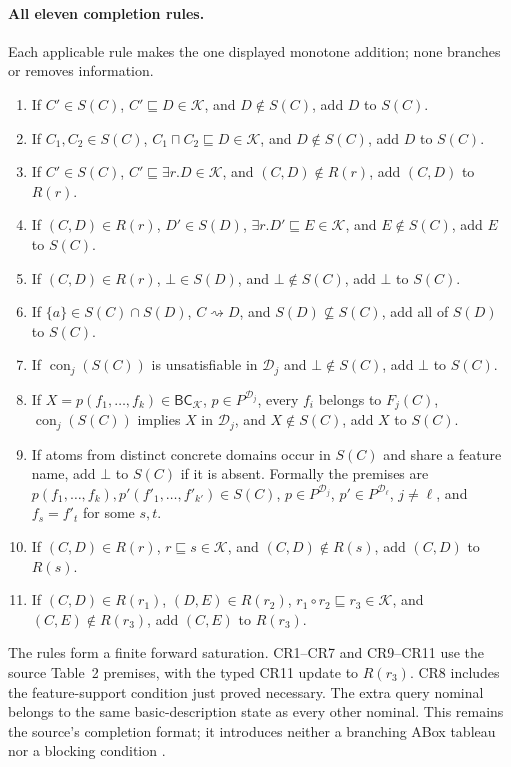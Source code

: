 \paragraph{All eleven completion rules.}
Each applicable rule makes the one displayed monotone addition; none branches
or removes information.
\begin{enumerate}
\item[(CR1)] If \(C'\in S(C)\), \(C'\sqsubseteq D\in\mathcal K\), and
\(D\notin S(C)\), add \(D\) to \(S(C)\).
\item[(CR2)] If \(C_1,C_2\in S(C)\),
\(C_1\sqcap C_2\sqsubseteq D\in\mathcal K\), and \(D\notin S(C)\), add
\(D\) to \(S(C)\).
\item[(CR3)] If \(C'\in S(C)\),
\(C'\sqsubseteq\exists r.D\in\mathcal K\), and \((C,D)\notin R(r)\), add
\((C,D)\) to \(R(r)\).
\item[(CR4)] If \((C,D)\in R(r)\), \(D'\in S(D)\),
\(\exists r.D'\sqsubseteq E\in\mathcal K\), and \(E\notin S(C)\), add
\(E\) to \(S(C)\).
\item[(CR5)] If \((C,D)\in R(r)\), \(\bot\in S(D)\), and
\(\bot\notin S(C)\), add \(\bot\) to \(S(C)\).
\item[(CR6)] If \(\{a\}\in S(C)\cap S(D)\),
\(C\rightsquigarrow D\), and \(S(D)\nsubseteq S(C)\), add all of \(S(D)\)
to \(S(C)\).
\item[(CR7)] If \(\operatorname{con}_j(S(C))\) is unsatisfiable in
\(\mathcal D_j\) and \(\bot\notin S(C)\), add \(\bot\) to \(S(C)\).
\item[(CR8)] If \(X=p(f_1,\ldots,f_k)\in\mathsf{BC}_{\mathcal K}\),
\(p\in P^{\mathcal D_j}\), every \(f_i\) belongs to \(F_j(C)\),
\(\operatorname{con}_j(S(C))\) implies \(X\) in \(\mathcal D_j\), and
\(X\notin S(C)\), add \(X\) to \(S(C)\).
\item[(CR9)] If atoms from distinct concrete domains occur in \(S(C)\) and
share a feature name, add \(\bot\) to \(S(C)\) if it is absent.  Formally the
premises are \(p(f_1,\ldots,f_k),p'(f'_1,\ldots,f'_{k'})\in S(C)\),
\(p\in P^{\mathcal D_j}\), \(p'\in P^{\mathcal D_\ell}\), \(j\ne\ell\),
and \(f_s=f'_t\) for some \(s,t\).
\item[(CR10)] If \((C,D)\in R(r)\), \(r\sqsubseteq s\in\mathcal K\), and
\((C,D)\notin R(s)\), add \((C,D)\) to \(R(s)\).
\item[(CR11)] If \((C,D)\in R(r_1)\), \((D,E)\in R(r_2)\),
\(r_1\circ r_2\sqsubseteq r_3\in\mathcal K\), and
\((C,E)\notin R(r_3)\), add \((C,E)\) to \(R(r_3)\).
\end{enumerate}
The rules form a finite forward saturation.  CR1--CR7 and CR9--CR11
use the source Table~2 premises, with the typed CR11 update to \(R(r_3)\).
CR8 includes the feature-support condition just proved necessary.
The extra query nominal belongs to the same basic-description state as every
other nominal.  This remains the source's completion format; it introduces
neither a branching ABox tableau nor a blocking condition
\cite[table~2]{BaaderBrandtLutz2005}
\cite[table~2 and lem.~6]{BaaderBrandtLutz2005TR}.

